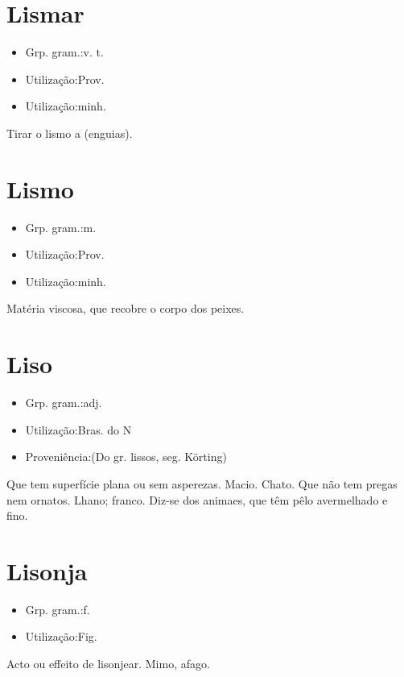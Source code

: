\section{Lismar}
\begin{itemize}
\item {Grp. gram.:v. t.}
\end{itemize}
\begin{itemize}
\item {Utilização:Prov.}
\end{itemize}
\begin{itemize}
\item {Utilização:minh.}
\end{itemize}
Tirar o lismo a (enguias).
\section{Lismo}
\begin{itemize}
\item {Grp. gram.:m.}
\end{itemize}
\begin{itemize}
\item {Utilização:Prov.}
\end{itemize}
\begin{itemize}
\item {Utilização:minh.}
\end{itemize}
Matéria viscosa, que recobre o corpo dos peixes.
\section{Liso}
\begin{itemize}
\item {Grp. gram.:adj.}
\end{itemize}
\begin{itemize}
\item {Utilização:Bras. do N}
\end{itemize}
\begin{itemize}
\item {Proveniência:(Do gr. \textunderscore lissos\textunderscore , seg. Körting)}
\end{itemize}
Que tem superfície plana ou sem asperezas.
Macio.
Chato.
Que não tem pregas nem ornatos.
Lhano; franco.
Diz-se dos animaes, que têm pêlo avermelhado e fino.
\section{Lisonja}
\begin{itemize}
\item {Grp. gram.:f.}
\end{itemize}
\begin{itemize}
\item {Utilização:Fig.}
\end{itemize}
Acto ou effeito de lisonjear.
Mimo, afago.
